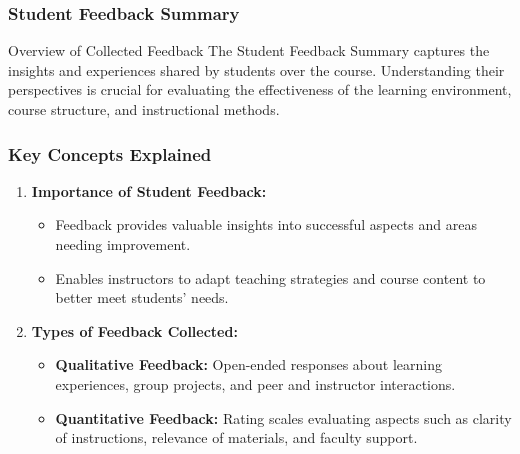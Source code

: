 \documentclass[aspectratio=169]{beamer}
\begin{document}
\begin{frame}[fragile]
    \frametitle{Student Feedback Summary}
    \begin{block}{Overview of Collected Feedback}
        The Student Feedback Summary captures the insights and experiences shared by students over the course. Understanding their perspectives is crucial for evaluating the effectiveness of the learning environment, course structure, and instructional methods.
    \end{block}
\end{frame}

\begin{frame}[fragile]
    \frametitle{Key Concepts Explained}
    \begin{enumerate}
        \item \textbf{Importance of Student Feedback:}
        \begin{itemize}
            \item Feedback provides valuable insights into successful aspects and areas needing improvement.
            \item Enables instructors to adapt teaching strategies and course content to better meet students' needs.
        \end{itemize}
        
        \item \textbf{Types of Feedback Collected:}
        \begin{itemize}
            \item \textbf{Qualitative Feedback:} Open-ended responses about learning experiences, group projects, and peer and instructor interactions.
            \item \textbf{Quantitative Feedback:} Rating scales evaluating aspects such as clarity of instructions, relevance of materials, and faculty support.
        \end{itemize}
    \end{enumerate}
\end{frame}
\end{document}
